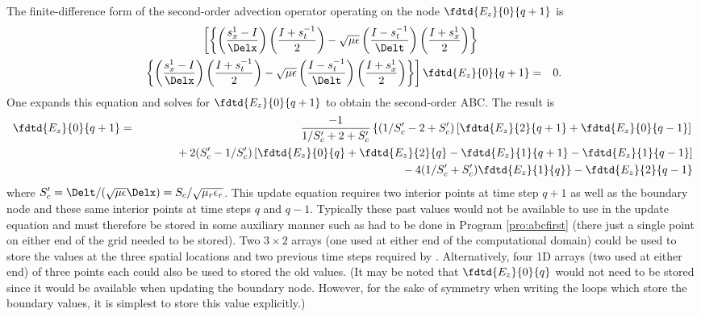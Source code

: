 The finite-difference form of the second-order advection operator
operating on the node $\fdtd{E_z}{0}{q+1}$ is
\begin{eqnarray}
   \left[\left\{\left(\frac{s_x^{1}-I}{\Delx}\right)
         \left(\frac{I+s_t^{-1}}{2}\right) -
    \sqrt{\mu\epsilon}
    \left(\frac{I-s_t^{-1}}{\Delt}\right)
    \left(\frac{I+s_x^{1}}{2}\right)\right\}\right.\qquad\qquad\mbox{ }&& 
   \nonumber\\
   \left.\left\{\left(\frac{s_x^{1}-I}{\Delx}\right)
         \left(\frac{I+s_t^{-1}}{2}\right) -
    \sqrt{\mu\epsilon}
    \left(\frac{I-s_t^{-1}}{\Delt}\right)
    \left(\frac{I+s_x^{1}}{2}\right)\right\}\right]
    \fdtd{E_z}{0}{q+1} &=& 0.
   \label{eq:advectionOperatorI}
\end{eqnarray}
One expands this equation and solves for $\fdtd{E_z}{0}{q+1}$ to
obtain the second-order ABC.  The result is
\begin{eqnarray}
  \fdtd{E_z}{0}{q+1} &=& \frac{-1}{1/S_c'+2+S_c'}
   \left\{(1/S_c'-2+S_c')
   \left[\fdtd{E_z}{2}{q+1}+\fdtd{E_z}{0}{q-1}\right]\right. \nonumber\\
  && \hspace{.4in}\mbox{}+2(S_c'-1/S_c')
  \left[\fdtd{E_z}{0}{q} + \fdtd{E_z}{2}{q} 
        - \fdtd{E_z}{1}{q+1}-\fdtd{E_z}{1}{q-1}\right] \nonumber\\
  &&
  \left.\hspace{1.5in}\mbox{}-4(1/S_c'+S_c')\fdtd{E_z}{1}{q}\right\}
   - \fdtd{E_z}{2}{q-1}
  \label{eq:secondOrderABC}
\end{eqnarray}
where
$S_c'=\Delt/(\sqrt{\mu\epsilon}\Delx)=S_c/\sqrt{\mu_r\epsilon_r}$.
This update equation requires two interior points at time step $q+1$
as well as the boundary node and these same interior points at time
steps $q$ and $q-1$.  Typically these past values would not be
available to use in the update equation and must therefore be stored
in some auxiliary manner such as had to be done in Program
\ref{pro:abcfirst} (there just a single point on either end of
the grid needed to be stored).  Two $3\times 2$ arrays (one used at
either end of the computational domain) could be used to store the
values at the three spatial locations and two previous time steps
required by .  Alternatively, four 1D arrays
(two used at either end) of three points each could also be used to
stored the old values.  (It may be noted that $\fdtd{E_z}{0}{q}$ would
not need to be stored since it would be available when updating the
boundary node.  However, for the sake of symmetry when writing the
loops which store the boundary values, it is simplest to store this
value explicitly.)

